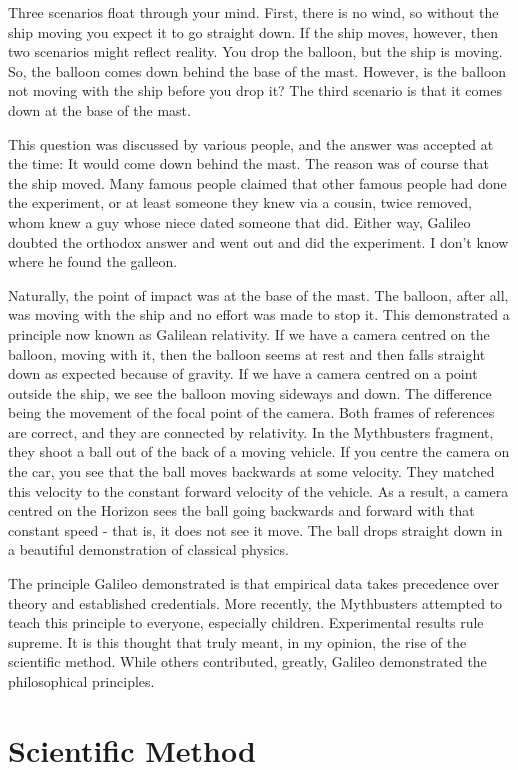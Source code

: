 \begin{multicols}{2}
Three scenarios float through your mind. First, there is no wind, so without the ship moving you expect it to go straight down. If the ship moves, however, then two scenarios might reflect reality. You drop the balloon, but the ship is moving. So, the balloon comes down behind the base of the mast. However, is the balloon not moving with the ship before you drop it? The third scenario is that it comes down at the base of the mast.

This question was discussed by various people, and the answer was accepted at the time: It would come down behind the mast. The reason was of course that the ship moved. Many famous people claimed that other famous people had done the experiment, or at least someone they knew via a cousin,	twice removed, whom knew a guy whose niece dated someone that did. Either way, Galileo doubted the orthodox answer and went out and did the experiment. I don't know where he found the galleon. 

Naturally, the point of impact was at the base of the mast. The balloon, after all, was moving with the ship and no effort was made to stop it. This demonstrated a principle now known as Galilean relativity. If we have a camera centred on the balloon, moving with it, then the balloon seems at rest and then falls straight down as expected because of gravity. If we have a camera centred on a point outside the ship, we see the balloon moving sideways and down. The difference being the movement of the focal point of the camera. Both frames of references are correct, and they are connected by relativity. In the Mythbusters fragment, they shoot a ball out of the back of a moving vehicle. If you centre the camera on the car, you see that the ball moves backwards at some velocity. They matched this velocity to the constant forward velocity of the vehicle. As a result, a camera centred on the Horizon sees the ball going backwards and forward with that constant speed - that is, it does not see it move. The ball drops straight down in a beautiful demonstration of classical physics.

The principle Galileo demonstrated is that empirical data takes precedence over theory and established credentials. More recently, the Mythbusters attempted to teach this principle to everyone, especially children. Experimental results rule supreme. It is this thought that truly meant, in my opinion, the rise of the scientific method. While others contributed, greatly, Galileo demonstrated the philosophical principles.

\section{Scientific Method}


\end{multicols}
